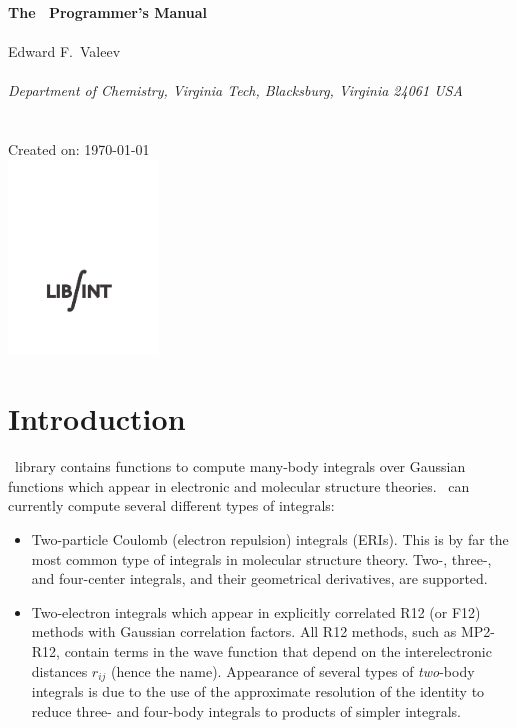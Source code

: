 \documentclass[10pt]{article}
\begin{document}


\begin{center}
{\bf {\Large The \LIBINT\ Programmer's Manual}} \\
~\\
Edward F.\ Valeev \\
~\\
{\em Department of Chemistry, Virginia Tech, Blacksburg, Virginia 24061 USA}\\
~\\
\LIBINTv \\
Created on: \today \\
\vspace{30\baselineskip}
\includegraphics[width=0.3\textwidth]{Libint_Logo3_alt.pdf}

\end{center}

\thispagestyle{empty}

\newpage
\section{Introduction}
\LIBINT\ library contains functions to compute many-body integrals over Gaussian
functions which appear in electronic and molecular structure theories.
\LIBINTv \cite{Libint1}\ can currently compute several different types of integrals:

\begin{itemize}

\item Two-particle Coulomb (electron repulsion) integrals (ERIs). This is by
far the most common type of integrals in molecular structure theory. Two-,
three-, and four-center integrals, and their geometrical derivatives, are
supported.

\item Two-electron integrals which appear in explicitly correlated R12 (or F12) methods
with Gaussian correlation factors.\cite{Kutzelnigg85,Kutzelnigg91,Persson96} All R12 methods, such as
MP2-R12, contain terms in the wave function that depend on the interelectronic distances
$r_{ij}$ (hence the name). Appearance of several types of {\em two}-body integrals
is due to the use of the approximate resolution of the identity to reduce three- and four-body
integrals to products of simpler integrals.

\end{itemize}
\end{document}
